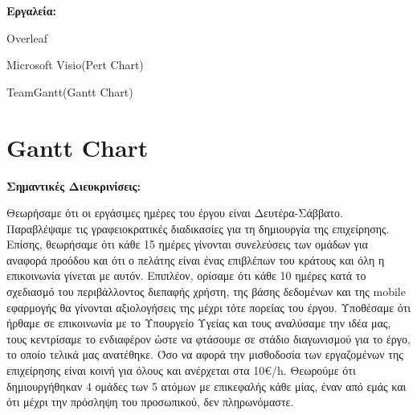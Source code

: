 \documentclass[12pt,a4paper,oneside]{article}
\begin{document}
\vspace{7cm}

\raggedright
\textbf{Εργαλεία:}

    Overleaf
    
    Microsoft Visio(Pert Chart)
    
    TeamGantt(Gantt Chart)

\newpage


\tableofcontents
{}

\newpage
\setcounter{page}{1}


\section{Gantt Chart}\label{sec:intro}
\pagestyle{fancy}
\textbf{Σημαντικές Διευκρινίσεις:}

\vspace{1mm}
Θεωρήσαμε ότι οι εργάσιμες ημέρες του έργου είναι Δευτέρα-Σάββατο. Παραβλέψαμε τις γραφειοκρατικές διαδικασίες για τη δημιουργία της επιχείρησης. Επίσης, θεωρήσαμε ότι κάθε 15 ημέρες γίνονται συνελεύσεις των ομάδων για αναφορά προόδου και ότι ο πελάτης είναι ένας επιβλέπων του κράτους και
όλη η επικοινωνία γίνεται με αυτόν. Επιπλέον, ορίσαμε ότι κάθε 10 ημέρες κατά το σχεδιασμό του
περιβάλλοντος διεπαφής χρήστη, της βάσης δεδομένων και της mobile εφαρμογής θα γίνονται αξιολογήσεις της μέχρι τότε πορείας του έργου. Υποθέσαμε ότι ήρθαμε σε επικοινωνία με το Υπουργείο Υγείας
και τους αναλύσαμε την ιδέα μας, τους κεντρίσαμε το ενδιαφέρον ώστε να φτάσουμε σε στάδιο διαγωνισμού για το έργο, το οποίο τελικά μας ανατέθηκε. Όσο να αφορά την μισθοδοσία των εργαζομένων της επιχείρησης είναι κοινή για όλους και ανέρχεται στα 10€/h. Θεωρούμε ότι δημιουργήθηκαν 4 ομάδες των 5 ατόμων με
επικεφαλής κάθε μίας, έναν από εμάς και ότι μέχρι την πρόσληψη του προσωπικού, δεν
πληρωνόμαστε.
\end{document}

